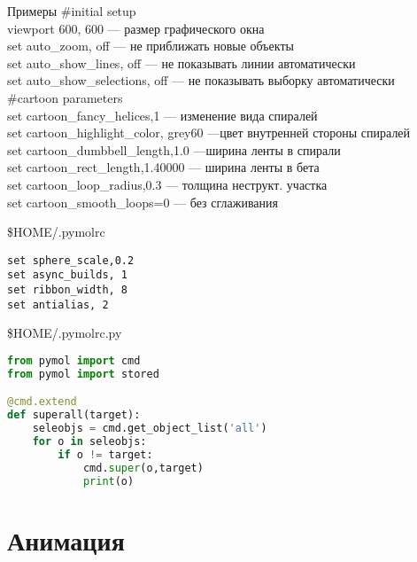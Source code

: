 \begin{frame}{Примеры}
	\small
	\#initial setup\\
	\textcolor{blue!40!white}{viewport 600, 600} --- размер графического окна\\
	\textcolor{blue!40!white}{set auto\_zoom, off} --- не приближать новые объекты\\
	\textcolor{blue!40!white}{set auto\_show\_lines, off} --- не показывать линии автоматически\\
	\textcolor{blue!40!white}{set auto\_show\_selections, off} --- не показывать выборку автоматически\\
	\#cartoon parameters\\
	\textcolor{blue!40!white}{set cartoon\_fancy\_helices,1} --- изменение вида спиралей\\
	\textcolor{blue!40!white}{set cartoon\_highlight\_color, grey60} ---цвет внутренней стороны спиралей\\
	\textcolor{blue!40!white}{set cartoon\_dumbbell\_length,1.0} ---ширина ленты в спирали\\
	\textcolor{blue!40!white}{set cartoon\_rect\_length,1.40000} --- ширина ленты в бета\\
	\textcolor{blue!40!white}{set cartoon\_loop\_radius,0.3} --- толщина неструкт. участка\\ 
	\textcolor{blue!40!white}{set cartoon\_smooth\_loops=0} --- без сглаживания\\
\end{frame}

\begin{frame}[fragile]{\$HOME/.pymolrc}
\centering
\begin{lstlisting}
set sphere_scale,0.2
set async_builds, 1
set ribbon_width, 8
set antialias, 2
\end{lstlisting}
\end{frame}

\begin{frame}[fragile]{\$HOME/.pymolrc.py}
\centering
\begin{lstlisting}[language=Python]
from pymol import cmd
from pymol import stored

@cmd.extend
def superall(target):
    seleobjs = cmd.get_object_list('all')
    for o in seleobjs:
        if o != target:
            cmd.super(o,target)
            print(o)
\end{lstlisting}

\end{frame}

\section{Анимация}

